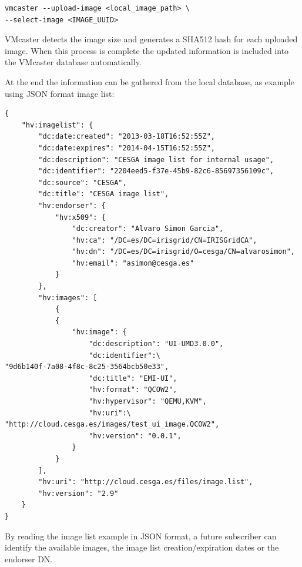 \documentclass{cai}
\begin{document}
\begin{verbatim}
vmcaster --upload-image <local_image_path> \
--select-image <IMAGE_UUID>
\end{verbatim}

VMcaster detects the image size and generates a SHA512 hash for each uploaded image. When this process is complete the updated information is included into the VMcaster database automatically.

At the end the information can be gathered from the local database, as example using JSON format image list:
\begin{verbatim}
{
    "hv:imagelist": {
        "dc:date:created": "2013-03-18T16:52:55Z", 
        "dc:date:expires": "2014-04-15T16:52:55Z", 
        "dc:description": "CESGA image list for internal usage", 
        "dc:identifier": "2204eed5-f37e-45b9-82c6-85697356109c", 
        "dc:source": "CESGA", 
        "dc:title": "CESGA image list", 
        "hv:endorser": {
            "hv:x509": {
                "dc:creator": "Alvaro Simon Garcia", 
                "hv:ca": "/DC=es/DC=irisgrid/CN=IRISGridCA", 
                "hv:dn": "/DC=es/DC=irisgrid/O=cesga/CN=alvarosimon", 
                "hv:email": "asimon@cesga.es"
            }
        }, 
        "hv:images": [
            {
            {
                "hv:image": {
                    "dc:description": "UI-UMD3.0.0", 
                    "dc:identifier":\ 
"9d6b140f-7a08-4f8c-8c25-3564bcb50e33", 
                    "dc:title": "EMI-UI", 
                    "hv:format": "QCOW2", 
                    "hv:hypervisor": "QEMU,KVM",  
                    "hv:uri":\ 
"http://cloud.cesga.es/images/test_ui_image.QCOW2", 
                    "hv:version": "0.0.1", 
                }
            }
        ], 
        "hv:uri": "http://cloud.cesga.es/files/image.list", 
        "hv:version": "2.9"
    }
}
\end{verbatim}
By reading the image list example in JSON format, a future subscriber can identify the available images, the image list creation/expiration dates or the endorser DN.
\end{document}
